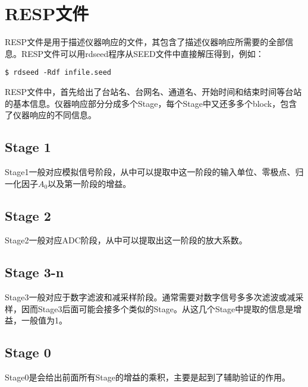 \section{RESP文件}
RESP文件是用于描述仪器响应的文件，其包含了描述仪器响应所需要的全部信息。RESP文件可以用rdseed程序从SEED文件中直接解压得到，例如：
\begin{verbatim}
$ rdseed -Rdf infile.seed
\end{verbatim}

RESP文件中，首先给出了台站名、台网名、通道名、开始时间和结束时间等台站的基本信息。仪器响应部分分成多个Stage，每个Stage中又还多多个block，包含了仪器响应的不同信息。

\subsection*{Stage 1}
Stage1一般对应模拟信号阶段，从中可以提取中这一阶段的输入单位、零极点、归一化因子$A_0$以及第一阶段的增益。

\subsection*{Stage 2}
Stage2一般对应ADC阶段，从中可以提取出这一阶段的放大系数。

\subsection*{Stage 3-n}
Stage3一般对应于数字滤波和减采样阶段。通常需要对数字信号多多次滤波或减采样，因而Stage3后面可能会接多个类似的Stage。从这几个Stage中提取的信息是增益，一般值为1。

\subsection{Stage 0}
Stage0是会给出前面所有Stage的增益的乘积，主要是起到了辅助验证的作用。
